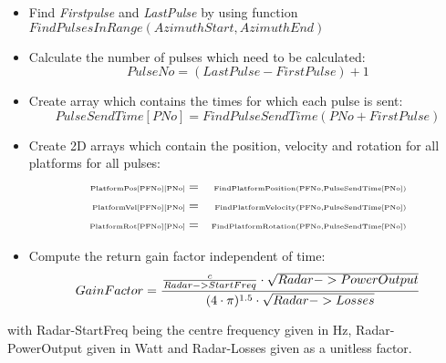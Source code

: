 \begin{itemize}
\item  Find \textit{Firstpulse} and \textit{LastPulse} by using function%
\newline%
$FindPulsesInRange(AzimuthStart,AzimuthEnd)$

\item  Calculate the number of pulses which need to be calculated: 
\begin{equation}
PulseNo=(LastPulse-FirstPulse)+1
\end{equation}

\item  Create array which contains the times for which each pulse is sent: 
\begin{equation}
PulseSendTime[PNo]=FindPulseSendTime(PNo+FirstPulse)
\end{equation}

\item  Create 2D arrays which contain the position, velocity and rotation
for all platforms for all pulses: 
\begin{eqnarray}
\text{{\tiny PlatformPos[PFNo][PNo]}} &=&\text{{\tiny %
FindPlatformPosition(PFNo,PulseSendTime[PNo])}}  \nonumber \\
\text{{\tiny PlatformVel[PFNo][PNo]}} &=&\text{{\tiny %
FindPlatformVelocity(PFNo,PulseSendTime[PNo])}} \\
\text{{\tiny PlatformRot[PFNo][PNo]}} &=&\text{{\tiny %
FindPlatformRotation(PFNo,PulseSendTime[PNo])}}  \nonumber
\end{eqnarray}

\item  Compute the return gain factor independent of time: 
\begin{equation}
GainFactor=\frac{\frac{c}{Radar->StartFreq}\cdot \sqrt{Radar->PowerOutput}}{%
(4\cdot \pi )^{1.5}\cdot \sqrt{Radar->Losses}}
\end{equation}
\end{itemize}

with Radar-\TEXTsymbol{>}StartFreq being the centre frequency given in Hz,
Radar-\TEXTsymbol{>}PowerOutput given in Watt and Radar-\TEXTsymbol{>}Losses
given as a unitless factor.

